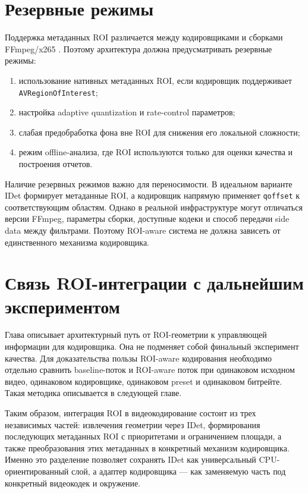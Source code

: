 \documentclass[12pt,a4paper,oneside,openany]{report}
\begin{document}
\section{Резервные режимы}

Поддержка метаданных ROI различается между кодировщиками и сборками FFmpeg/x265 \cite{ffmpeg_roi,x265}. Поэтому архитектура должна предусматривать резервные режимы:
\begin{enumerate}[label=\arabic*)]
\item использование нативных метаданных ROI, если кодировщик поддерживает \texttt{AVRegionOfInterest};
\item настройка adaptive quantization и rate-control параметров;
\item слабая предобработка фона вне ROI для снижения его локальной сложности;
\item режим offline-анализа, где ROI используются только для оценки качества и построения отчетов.
\end{enumerate}

Наличие резервных режимов важно для переносимости. В идеальном варианте IDet формирует метаданные ROI, а кодировщик напрямую применяет \texttt{qoffset} к соответствующим областям. Однако в реальной инфраструктуре могут отличаться версии FFmpeg, параметры сборки, доступные кодеки и способ передачи side data между фильтрами. Поэтому ROI-aware система не должна зависеть от единственного механизма кодировщика.

\section{Связь ROI-интеграции с дальнейшим экспериментом}

Глава описывает архитектурный путь от ROI-геометрии к управляющей информации для кодировщика. Она не подменяет собой финальный эксперимент качества. Для доказательства пользы ROI-aware кодирования необходимо отдельно сравнить baseline-поток и ROI-aware поток при одинаковом исходном видео, одинаковом кодировщике, одинаковом preset и одинаковом битрейте. Такая методика описывается в следующей главе.

Таким образом, интеграция ROI в видеокодирование состоит из трех независимых частей: извлечения геометрии через IDet, формирования последующих метаданных ROI с приоритетами и ограничением площади, а также преобразования этих метаданных в конкретный механизм кодировщика. Именно это разделение позволяет сохранять IDet как универсальный CPU-ориентированный слой, а адаптер кодировщика --- как заменяемую часть под конкретный видеокодек и окружение.
\end{document}
